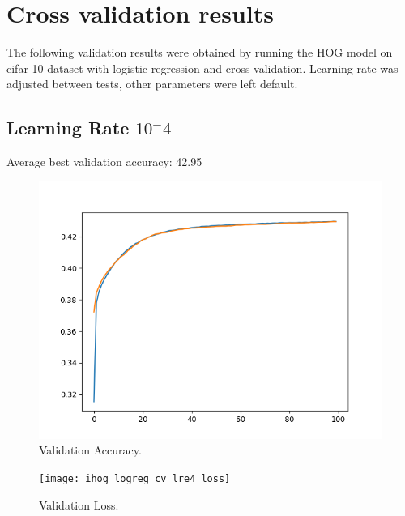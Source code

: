 \documentclass[12pt, letter]{article}
\begin{document}
\pagebreak


\section{Cross validation results}
The following validation results were obtained by running the HOG model on
cifar-10 dataset with logistic regression and cross validation. Learning rate
was adjusted between tests, other parameters were left default.
\subsection{Learning Rate $10^-4$}
Average best validation accuracy: 42.95%
\begin{figure}[h]
  \centering
  \includegraphics[scale=0.60]{hog_logreg_cv_lre4_acc}
  \caption{Validation Accuracy.}
  \label{fig:eg}
\end{figure}
\begin{figure}[h]
  \centering
  \texttt{[image: ihog\_logreg\_cv\_lre4\_loss]}
  \caption{Validation Loss.}
  \label{fig:eg}
\end{figure}
\pagebreak
\end{document}
